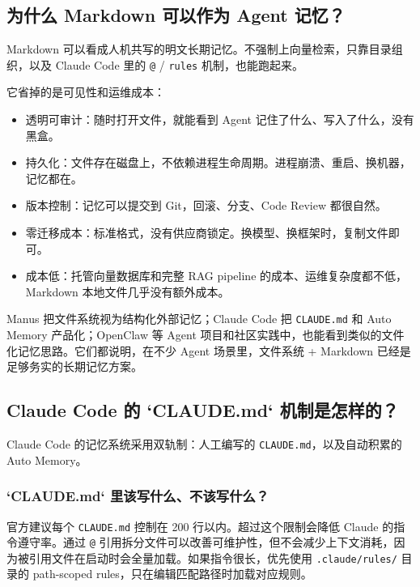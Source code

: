 \documentclass[10pt,a4paper]{ctexart}
\begin{document}
\subsection{为什么 Markdown 可以作为 Agent 记忆？}


Markdown 可以看成人机共写的明文长期记忆。不强制上向量检索，只靠目录组织，以及 Claude Code 里的 \texttt{@} / \texttt{rules} 机制，也能跑起来。



它省掉的是可见性和运维成本：


\begin{itemize}[itemsep=2pt, topsep=4pt]
  \item 透明可审计：随时打开文件，就能看到 Agent 记住了什么、写入了什么，没有黑盒。
  \item 持久化：文件存在磁盘上，不依赖进程生命周期。进程崩溃、重启、换机器，记忆都在。
  \item 版本控制：记忆可以提交到 Git，回滚、分支、Code Review 都很自然。
  \item 零迁移成本：标准格式，没有供应商锁定。换模型、换框架时，复制文件即可。
  \item 成本低：托管向量数据库和完整 RAG pipeline 的成本、运维复杂度都不低，Markdown 本地文件几乎没有额外成本。
\end{itemize}


Manus 把文件系统视为结构化外部记忆；Claude Code 把 \texttt{CLAUDE.md} 和 Auto Memory 产品化；OpenClaw 等 Agent 项目和社区实践中，也能看到类似的文件化记忆思路。它们都说明，在不少 Agent 场景里，文件系统 + Markdown 已经是足够务实的长期记忆方案。



\subsection{Claude Code 的 `CLAUDE.md` 机制是怎样的？}


Claude Code 的记忆系统采用双轨制：人工编写的 \texttt{CLAUDE.md}，以及自动积累的 Auto Memory。



\subsubsection{`CLAUDE.md` 里该写什么、不该写什么？}


官方建议每个 \texttt{CLAUDE.md} 控制在 200 行以内。超过这个限制会降低 Claude 的指令遵守率。通过 \texttt{@} 引用拆分文件可以改善可维护性，但不会减少上下文消耗，因为被引用文件在启动时会全量加载。如果指令很长，优先使用 \texttt{.claude/rules/} 目录的 path-scoped rules，只在编辑匹配路径时加载对应规则。
\end{document}
